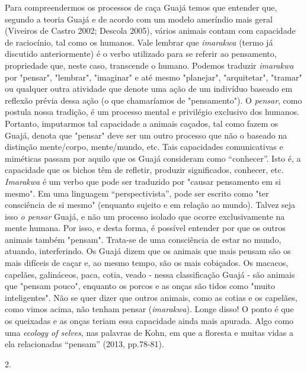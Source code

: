 Para compreendermos os processos de caça Guajá temos que entender que,
segundo a teoria Guajá e de acordo com um modelo ameríndio mais geral
(Viveiros de Castro 2002; Descola 2005), vários animais contam com
capacidade de raciocínio, tal como os humanos. Vale lembrar que
\emph{imarakwa} (termo já discutido anteriormente) é o verbo utilizado
para se referir ao pensamento, propriedade que, neste caso, transcende o
humano. Podemos traduzir \emph{imarakwa} por "pensar", "lembrar",
"imaginar" e até mesmo "planejar", "arquitetar", "tramar" ou qualquer
outra atividade que denote uma ação de um indivíduo baseado em reflexão
prévia dessa ação (o que chamaríamos de "pensamento"). O \emph{pensar},
como postula nossa tradição, é um processo mental e privilégio exclusivo
dos humanos. Portanto, imputarmos tal capacidade a animais caçados, tal
como fazem os Guajá, denota que "pensar" deve ser um outro processo que
não o baseado na distinção mente/corpo, mente/mundo, etc. Tais
capacidades comunicativas e miméticas passam por aquilo que os Guajá
consideram como ``conhecer''. Isto é, a capacidade que os bichos têm de
refletir, produzir significados, conhecer, etc. \emph{Imarakwa} é um
verbo que pode ser traduzido por "causar pensamento em si mesmo". Em uma
linguagem ``perspectivista'', pode ser escrito como "ter consciência de
si mesmo" (enquanto sujeito e em relação ao mundo). Talvez seja isso
\emph{o pensar} Guajá, e não um processo isolado que ocorre
exclusivamente na mente humana. Por isso, e desta forma, é possível
entender por que os outros animais também "pensam". Trata-se de uma
consciência de estar no mundo, atuando, interferindo. Os Guajá dizem que
os animais que mais pensam são os mais difíceis de caçar e, ao mesmo
tempo, são os mais cobiçados. Os macacos, capelães, galináceos, paca,
cotia, veado - nessa classificação Guajá - são animais que "pensam
pouco", enquanto os porcos e as onças são tidos como "muito
inteligentes". Não se quer dizer que outros animais, como as cotias e os
capelães, como vimos acima, não tenham pensar (\emph{imarakwa}). Longe
disso! O ponto é que os queixadas e as onças teriam essa capacidade
ainda mais apurada. Algo como uma \emph{ecology of selves}, nas palavras
de Kohn, em que a floresta e muitas vidas a ela relacionadas ``pensam''
(2013, pp.78-81).

2.

